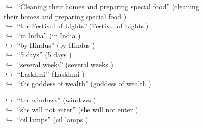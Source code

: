 \documentclass[11pt,a4paper, onecolumn]{article}
\begin{document}
\begin{figure}[t] \small \begin{tcolorbox}[boxsep=0pt,left=5pt,right=0pt,top=2pt,colback = yellow!5] \begin{dialogue}
 \small 
\colorbox{pink!25}{$\hookrightarrow$}
{ ``Cleaning their homes and preparing special food'' (cleaning their homes and preparing special food ) }
\\
\colorbox{pink!25}{$\hookrightarrow$}
{ ``the Festival of Lights'' (Festival of Lights ) }
\\
\colorbox{pink!25}{$\hookrightarrow$}
{ ``in India'' (in India ) }
\\
\colorbox{pink!25}{$\hookrightarrow$}
{ ``by Hindus'' (by Hindus ) }
\\
\colorbox{pink!25}{$\hookrightarrow$}
{ ``5 days'' (5 days ) }
\\
\colorbox{pink!25}{$\hookrightarrow$}
{ ``several weeks'' (several weeks ) }
\\
\colorbox{pink!25}{$\hookrightarrow$}
{ ``Laskhmi'' (Laskhmi ) }
\\
\colorbox{pink!25}{$\hookrightarrow$}
{ ``the goddess of wealth'' (goddess of wealth ) }
 \end{dialogue}\end{tcolorbox}\end{figure}\begin{figure}[t] \small \begin{tcolorbox}[boxsep=0pt,left=5pt,right=0pt,top=2pt,colback = yellow!5] \begin{dialogue}
 \small 
\colorbox{pink!25}{$\hookrightarrow$}
{ ``the windows'' (windows ) }
\\
\colorbox{pink!25}{$\hookrightarrow$}
{ ``she will not enter'' (she will not enter ) }
\\
\colorbox{pink!25}{$\hookrightarrow$}
{ ``oil lamps'' (oil lamps ) }
\\

\end{dialogue}
\end{tcolorbox}
\end{figure}
\end{document}
